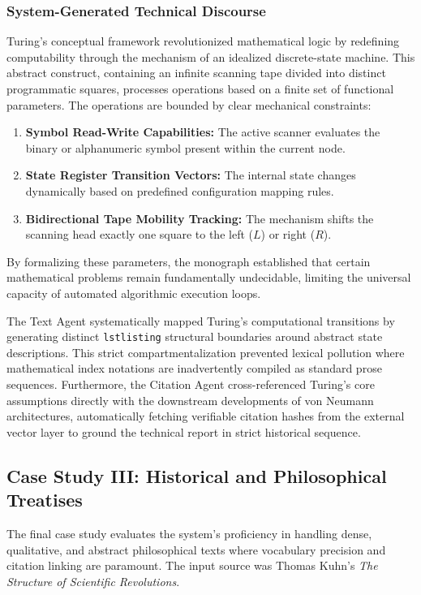\subsubsection{System-Generated Technical Discourse}
Turing's conceptual framework revolutionized mathematical logic by redefining computability through the mechanism of an idealized discrete-state machine. This abstract construct, containing an infinite scanning tape divided into distinct programmatic squares, processes operations based on a finite set of functional parameters. The operations are bounded by clear mechanical constraints:
\begin{enumerate}
    \item \textbf{Symbol Read-Write Capabilities:} The active scanner evaluates the binary or alphanumeric symbol present within the current node.
    \item \textbf{State Register Transition Vectors:} The internal state changes dynamically based on predefined configuration mapping rules.
    \item \textbf{Bidirectional Tape Mobility Tracking:} The mechanism shifts the scanning head exactly one square to the left (\(L\)) or right (\(R\)).
\end{enumerate}

By formalizing these parameters, the monograph established that certain mathematical problems remain fundamentally undecidable, limiting the universal capacity of automated algorithmic execution loops.

The Text Agent systematically mapped Turing’s computational transitions by generating distinct \texttt{lstlisting} structural boundaries around abstract state descriptions. This strict compartmentalization prevented lexical pollution where mathematical index notations are inadvertently compiled as standard prose sequences. Furthermore, the Citation Agent cross-referenced Turing's core assumptions directly with the downstream developments of von Neumann architectures, automatically fetching verifiable citation hashes from the external vector layer to ground the technical report in strict historical sequence.

\subsection{Case Study III: Historical and Philosophical Treatises}
The final case study evaluates the system's proficiency in handling dense, qualitative, and abstract philosophical texts where vocabulary precision and citation linking are paramount. The input source was Thomas Kuhn's \textit{The Structure of Scientific Revolutions}.

